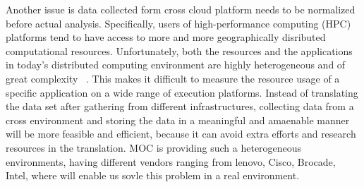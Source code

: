 Another issue is data collected form cross cloud platform needs to be normalized before actual analysis. Specifically, users of high-performance computing (HPC) platforms tend to have access to more and more geographically disributed computational resources. Unfortunately, both the resources and the applications in today’s distributed computing environment are highly heterogeneous and of great complexity ~\cite{Yang2005}. This makes it difficult to measure the resource usage of a specific application on a wide range of execution platforms. Instead of translating the data set after gathering from different infrastructures, collecting data from a cross environment and storing the data in a meaningful and amaenable manner will be more feasible and efficient, because it can avoid extra efforts and research resources in the translation. MOC is providing such a heterogeneous environments, having different vendors ranging from lenovo, Cisco, Brocade, Intel, where will enable us sovle this problem in a real environment.
